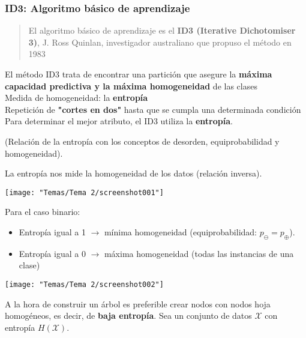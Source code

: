 \subsubsection{ID3: Algoritmo básico de aprendizaje}

\begin{quote}
	El algoritmo básico de aprendizaje es el \textbf{ID3 (Iterative Dichotomiser 3)}, J. Ross Quinlan, investigador australiano que propuso el método en 1983
\end{quote}
El método ID3 trata de encontrar una partición que asegure la \textbf{máxima capacidad predictiva y la máxima homogeneidad} de las clases\\
Medida de homogeneidad: la \textbf{entropía}\\
Repetición de \textbf{"cortes en dos"} hasta que se cumpla una determinada condición
Para determinar el mejor atributo, el ID3 utiliza la \textbf{entropía}.


(Relación de la entropía con los conceptos de desorden, equiprobabilidad y homogeneidad).

La entropía nos mide la homogeneidad de los datos (relación inversa).
\begin{center}
	\texttt{[image: "Temas/Tema 2/screenshot001"]}
\end{center}
\begin{minipage}{0.45\textwidth}
	Para el caso binario:
	\begin{itemize}
		\item Entropía igual a 1 $\to$ mínima homogeneidad (equiprobabilidad: $p_\ominus=p_\oplus$).
		\item Entropía igual a 0 $\to$ máxima homogeneidad (todas las instancias de una clase)
	\end{itemize}
\end{minipage}\qquad\begin{minipage}{0.45\textwidth}
\begin{center}
	\texttt{[image: "Temas/Tema 2/screenshot002"]}
\end{center}
\end{minipage}
A la hora de construir un árbol es preferible crear nodos con nodos hoja homogéneos, es decir, de \textbf{baja entropía}.
Sea un conjunto de datos $\mathcal{X}$ con entropía $H(\mathcal{X})$.

